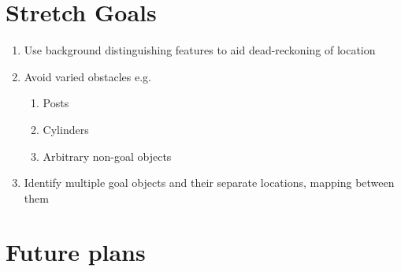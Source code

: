 \documentclass[10pt,a4paper]{report}
\begin{document}
				\section{Stretch Goals}
				\begin{enumerate}
					\item Use background distinguishing features to aid dead-reckoning of location
					\item Avoid varied obstacles e.g.
					\begin{enumerate}
						\item Posts
						\item Cylinders
						\item Arbitrary non-goal objects
					\end{enumerate}
					\item Identify multiple goal objects and their separate locations, mapping between them
				\end{enumerate}
				
\section*{Future plans}
\end{document}
